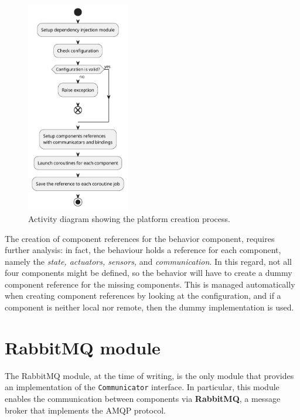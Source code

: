 \begin{figure}[ht]
	\centering
	\includegraphics[width=0.4\textwidth]{figures/platform-setup-sequence.pdf}
	\caption{Activity diagram showing the platform creation process.}
	\label{fig:platform-configuration}
\end{figure}

The creation of component references for the behavior component, requires further analysis: in fact, the behaviour holds a reference for each
component, namely the \emph{state, actuators, sensors,} and \emph{communication}.
In this regard, not all four components might be defined, so the behavior will have to create a dummy component reference for the missing components.
This is managed automatically when creating component references by looking at the configuration, and if a component is neither local nor remote,
then the dummy implementation is used.


\section{RabbitMQ module}
\label{sec:rabbitmq-module-impl}

The RabbitMQ module, at the time of writing, is the only module that provides an implementation of the \texttt{Communicator} interface.
In particular, this module enables the communication between components via \textbf{RabbitMQ}, a message broker that implements the AMQP protocol.

